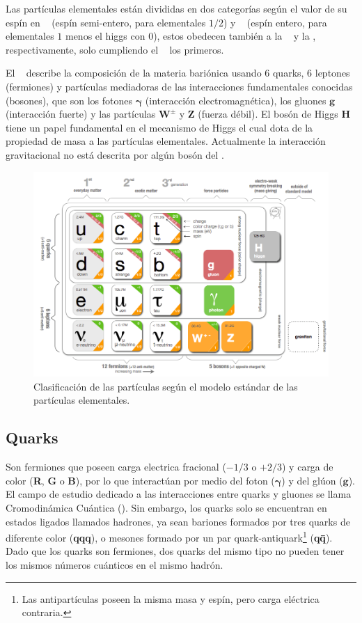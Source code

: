Las partículas elementales están divididas en dos categorías según el valor de su espín en \fermiones ~ (espín semi-entero, para elementales $1/2$) y \bosones ~ (espín entero, para elementales $1$ menos el higgs con $0$), estos obedecen también a la \fermidirac ~ y la \boseeinstein, respectivamente, solo cumpliendo el \pauli ~ los primeros.

El \ME ~ describe la composición de la materia bariónica usando 6 quarks, 6 leptones (fermiones) y partículas mediadoras de las interacciones fundamentales conocidas (bosones), que son los fotones $\mathbf{\gamma}$ (interacción electromagnética), los gluones $\mathbf{g}$ (interacción fuerte) y las partículas $\mathbf{W}^\pm$ y $\mathbf{Z}$ (fuerza débil). 
El bosón de Higgs $\mathbf{H}$ tiene un papel fundamental en el mecanismo de Higgs el cual dota de la propiedad de masa a las partículas elementales. Actualmente la interacción gravitacional no está descrita por algún bosón del \ME.

\begin{figure}[!b]
    \centering
    \includegraphics[width=.8\textwidth]{Fisica_de_Particulas/imagenes/standard_model.png}
    \caption{Clasificación de las partículas según el modelo estándar de las partículas elementales.}
    \label{estandar}
\end{figure}

\subsection*{Quarks}

Son fermiones que poseen carga electrica fracional ($- 1/3$ o $+ 2/3$) y carga de color (\textbf{R}, \textbf{G} o \textbf{B}), por lo que interactúan por medio del foton ($\mathbf{\gamma}$) y del glúon ($\mathbf{g}$). El campo de estudio dedicado a las interacciones entre quarks y gluones se llama Cromodinámica Cuántica (\QCD). Sin embargo, los quarks solo se encuentran en estados ligados llamados hadrones, ya sean bariones formados por tres quarks de diferente color (\textbf{qqq}), o mesones formado por un par quark-antiquark\footnote{Las antipartículas poseen la misma masa y espín, pero carga eléctrica contraria.} (\textbf{q\={q}}). Dado que los quarks son fermiones, dos quarks del mismo tipo no pueden tener los mismos n\'umeros cu\'anticos en el mismo hadrón.

